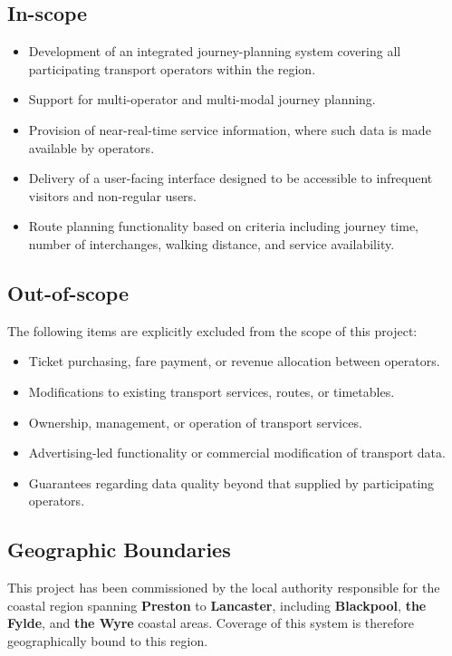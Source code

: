 \documentclass{article}
\begin{document}
\subsection{In-scope}
\begin{itemize}[itemsep=2pt, topsep=4pt, parsep=0pt]
    \item Development of an integrated journey-planning system covering all participating transport operators within the region.
    \item Support for multi-operator and multi-modal journey planning.
    \item Provision of near-real-time service information, where such data is made available by operators.
    \item Delivery of a user-facing interface designed to be accessible to infrequent visitors and non-regular users.
    \item Route planning functionality based on criteria including journey time, number of interchanges, walking distance, and service availability.
\end{itemize}


\subsection{Out-of-scope}
The following items are explicitly excluded from the scope of this project:
\begin{itemize}[itemsep=2pt, topsep=4pt, parsep=0pt]
    \item Ticket purchasing, fare payment, or revenue allocation between operators.
    \item Modifications to existing transport services, routes, or timetables.
    \item Ownership, management, or operation of transport services.
    \item Advertising-led functionality or commercial modification of transport data.
    \item Guarantees regarding data quality beyond that supplied by participating operators.
\end{itemize}


\subsection{Geographic Boundaries}
This project has been commissioned by the local authority responsible for the coastal region spanning \textbf{Preston} to \textbf{Lancaster}, including \textbf{Blackpool}, \textbf{the Fylde}, and \textbf{the Wyre} coastal areas. Coverage of this system is therefore geographically bound to this region.
\end{document}
